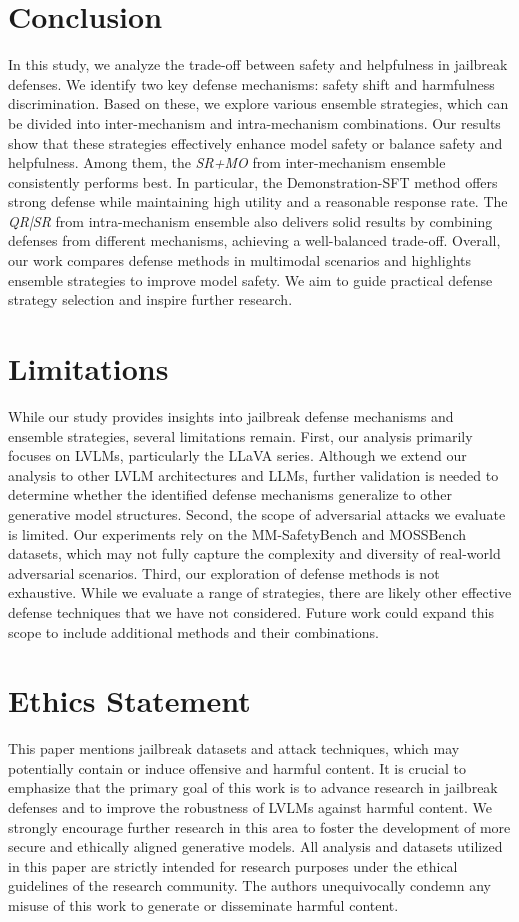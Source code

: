 \section{Conclusion}
In this study, we analyze the trade-off between safety and helpfulness in jailbreak defenses. We identify two key defense mechanisms: safety shift and harmfulness discrimination. Based on these, we explore various ensemble strategies, which can be divided into inter-mechanism and intra-mechanism combinations. Our results show that these strategies effectively enhance model safety or balance safety and helpfulness.
Among them, the \textit{SR+MO} from inter-mechanism ensemble consistently performs best. In particular, the Demonstration-SFT method  offers strong defense while maintaining high utility and a reasonable response rate. The \textit{QR|SR} from intra-mechanism ensemble also delivers solid results by combining defenses from different mechanisms, achieving a well-balanced trade-off.
Overall, our work compares defense methods in multimodal scenarios and highlights ensemble strategies to improve model safety. We aim to guide practical defense strategy selection and inspire further research.



\section*{Limitations}
While our study provides insights into jailbreak defense mechanisms and ensemble strategies, several limitations remain. First, our analysis primarily focuses on LVLMs, particularly the LLaVA series. Although we extend our analysis to other LVLM architectures and LLMs, further validation is needed to determine whether the identified defense mechanisms generalize to other generative model structures.
Second, the scope of adversarial attacks we evaluate is limited. Our experiments rely on the MM-SafetyBench and MOSSBench datasets, which may not fully capture the complexity and diversity of real-world adversarial scenarios. Third, our exploration of defense methods is not exhaustive. While we evaluate a range of strategies, there are likely other effective defense techniques that we have not considered. Future work could expand this scope to include additional methods and their combinations.

\section*{Ethics Statement}
This paper mentions jailbreak datasets and attack techniques, which may potentially contain or induce offensive and harmful content. It is crucial to emphasize that the primary goal of this work is to advance research in jailbreak defenses and to improve the robustness of LVLMs against harmful content. We strongly encourage further research in this area to foster the development of more secure and ethically aligned generative models. All analysis and datasets utilized in this paper are strictly intended for research purposes under the ethical guidelines of the research community. The authors unequivocally condemn any misuse of this work to generate or disseminate harmful content.